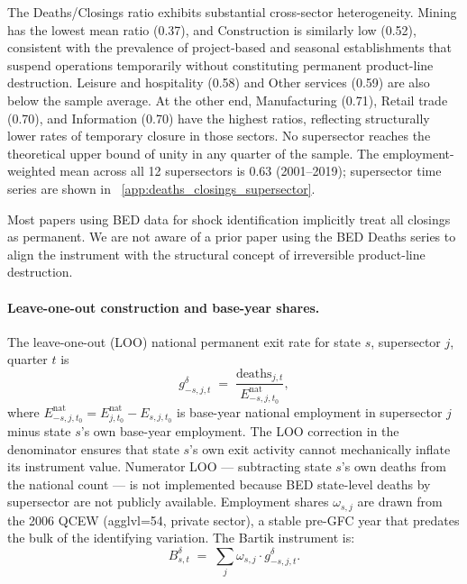 \documentclass[authoryear, review, 12pt]{elsarticle}
\begin{document}
	The Deaths/Closings ratio exhibits substantial cross-sector
	heterogeneity.  Mining has the lowest mean ratio (0.37), and
	Construction is similarly low (0.52), consistent with the prevalence
	of project-based and seasonal establishments that suspend operations
	temporarily without constituting permanent product-line destruction.
	Leisure and hospitality (0.58) and Other services (0.59) are also
	below the sample average.  At the other end, Manufacturing (0.71),
	Retail trade (0.70), and Information (0.70) have the highest ratios,
	reflecting structurally lower rates of temporary closure in those
	sectors.  No supersector reaches the theoretical upper bound of unity
	in any quarter of the sample.  The employment-weighted mean across all
	12 supersectors is 0.63 (2001--2019); supersector time series are
	shown in ~\ref{app:deaths_closings_supersector}.

	Most papers using BED data for shock identification
	\citep[e.g.,][]{elsby_2013} implicitly treat all
	closings as permanent.  We are not aware of a prior paper using the
	BED Deaths series to align the instrument with the structural concept
	of irreversible product-line destruction.

	\paragraph{Leave-one-out construction and base-year shares.}
	The leave-one-out (LOO) national permanent exit rate for state $s$,
	supersector $j$, quarter $t$ is
	\begin{equation}\label{eq:loo_rate}
		g^{\delta}_{-s,j,t}
		\;=\;
		\frac{\text{deaths}_{j,t}}
		     {E^{\text{nat}}_{-s,j,t_0}},
	\end{equation}
	where $E^{\text{nat}}_{-s,j,t_0}=E^{\text{nat}}_{j,t_0}-E_{s,j,t_0}$
	is base-year national employment in supersector $j$ minus state $s$'s
	own base-year employment.  The LOO correction in the denominator
	ensures that state $s$'s own exit activity cannot mechanically inflate
	its instrument value.  Numerator LOO --- subtracting state $s$'s own
	deaths from the national count --- is not implemented because
	BED state-level deaths by supersector are not publicly available.  Employment shares $\omega_{s,j}$ are drawn from the 2006
	QCEW (agglvl=54, private sector), a stable pre-GFC year that predates
	the bulk of the identifying variation.  The Bartik instrument is:
	\begin{equation}\label{eq:bartik_delta}
		B^{\delta}_{s,t}
		\;=\;
		\sum_{j} \omega_{s,j}\cdot g^{\delta}_{-s,j,t}.
	\end{equation}
\end{document}
